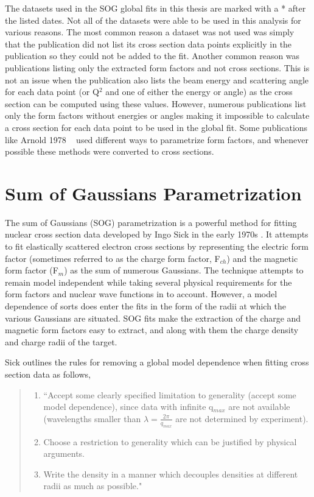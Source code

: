 


The datasets used in the SOG global fits in this thesis are marked with a * after the listed dates. Not all of the datasets were able to be used in this analysis for various reasons. The most common reason a dataset was not used was simply that the publication did not list its cross section data points explicitly in the publication so they could not be added to the fit. Another common reason was publications listing only the extracted form factors and not cross sections. This is not an issue when the publication also lists the beam energy and scattering angle for each data point (or Q$^2$ and one of either the energy or angle) as the cross section can be computed using these values. However, numerous publications list only the form factors without energies or angles making it impossible to calculate a cross section for each data point to be used in the global fit. Some publications like Arnold 1978 ~\cite{Article:Arnold} used different ways to parametrize form factors, and whenever possible these methods were converted to cross sections.

\section{Sum of Gaussians Parametrization}
\label{sec:sog}

The sum of Gaussians (SOG) parametrization is a powerful method for fitting nuclear cross section data developed by Ingo Sick in the early 1970s \cite{Article:SOG}. It attempts to fit elastically scattered electron cross sections by representing the electric form factor (sometimes referred to as the charge form factor, F$_{ch}$) and the magnetic form factor (F$_{m}$) as the sum of numerous Gaussians. The technique attempts to remain model independent while taking several physical requirements for the form factors and nuclear wave functions in to account. However, a model dependence of sorts does enter the fits in the form of the radii at which the various Gaussians are situated. SOG fits make the extraction of the charge and magnetic form factors easy to extract, and along with them the charge density and charge radii of the target.

Sick outlines the rules for removing a global model dependence when fitting cross section data as follows,

\begin{quote}
	\begin{enumerate}
		\item ``Accept some clearly specified limitation to generality (accept some model dependence), since data with infinite q$_{max}$ are not available (wavelengths smaller than $\lambda = \frac{2\pi}{q_{max}}$ are not determined by experiment).
		\item Choose a restriction to generality which can be justified by physical arguments.
		\item Write the density in a manner which decouples densities at different radii as much as possible." \cite{Article:SOG}
	\end{enumerate}
\end{quote} 

